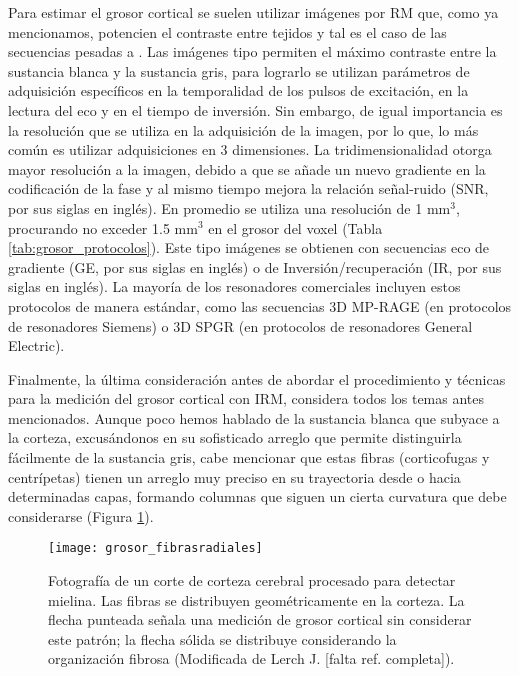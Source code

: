 Para estimar el grosor cortical se suelen utilizar imágenes por RM que, como ya mencionamos,
potencien el contraste entre tejidos y tal es el caso de las secuencias pesadas a \Tone. Las imágenes tipo
\Tone permiten el máximo contraste entre la sustancia blanca y la sustancia gris, para lograrlo se utilizan
parámetros de adquisición específicos en la temporalidad de los pulsos de excitación, en la lectura del
eco y en el tiempo de inversión. Sin embargo, de igual importancia es la resolución que se utiliza en la
adquisición de la imagen, por lo que, lo más común es utilizar adquisiciones en 3 dimensiones. La
tridimensionalidad otorga mayor resolución a la imagen, debido a que se añade un nuevo gradiente en
la codificación de la fase y al mismo tiempo mejora la relación señal-ruido (SNR, por sus siglas en
inglés). En promedio se utiliza una resolución de 1 mm${^3}$, procurando no exceder 1.5 mm${^3}$ en el grosor
del voxel (Tabla \ref{tab:grosor_protocolos}). Este tipo imágenes se obtienen con secuencias eco de gradiente (GE, por sus siglas en inglés) o de Inversión/recuperación (IR, por sus siglas en inglés). La mayoría de los resonadores
comerciales incluyen estos protocolos de manera estándar, como las secuencias 3D MP-RAGE (en
protocolos de resonadores Siemens) o 3D SPGR (en protocolos de resonadores General Electric).





Finalmente, la última consideración antes de abordar el procedimiento y técnicas para la medición del
grosor cortical con IRM, considera todos los temas antes mencionados. Aunque poco hemos hablado
de la sustancia blanca que subyace a la corteza, excusándonos en su sofisticado arreglo que permite
distinguirla fácilmente de la sustancia gris, cabe mencionar que estas fibras (corticofugas y centrípetas)
tienen un arreglo muy preciso en su trayectoria desde o hacia determinadas capas, formando columnas
que siguen un cierta curvatura que debe considerarse (Figura \ref{fig:grosor_fibrasradiales}).


\begin{figure}[htb]
\begin{figg}
   \texttt{[image: grosor\_fibrasradiales]}
   \caption{Fotografía de un corte de corteza cerebral procesado para detectar mielina. Las fibras se distribuyen geométricamente en la corteza. La flecha punteada señala una medición de grosor cortical sin considerar este patrón; la flecha sólida se distribuye considerando la organización fibrosa (Modificada de Lerch J. [falta ref. completa]).
}
 \label{fig:grosor_fibrasradiales}
 \end{figg}
\end{figure}




